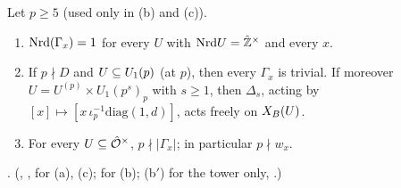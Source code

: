 \begin{lemma}\label{lem:s01-stab}
Let $p\ge5$ (used only in (b) and (c)).
\begin{enumerate}[label=(\alph*)]
\item $\mathrm{Nrd}(\Gamma_x)=1$ for every $U$ with $\mathrm{Nrd} U=\hat{\mathbb{Z}}^\times$ and every $x$.
\item If $p\nmid D$ and $U\subseteq U_1(p)$ (at $p$), then every $\Gamma_x$ is trivial. If moreover $U=U^{(p)}\times U_{1}(p^s)_p$ with $s\ge1$,
  then $\Delta_s$, acting by $[x]\mapsto[x\,\iota_p^{-1}\mathrm{diag}(1,d)]$, acts freely on $X_B(U)$.
\item For every $U\subseteq\hat{\mathcal{O}}^\times$, $p\nmid|\Gamma_x|$; in particular $p\nmid w_x$.
\end{enumerate}
\stproved. \stformal{} (, ,
 for (a), (c);  for (b); (b$'$) for the tower only,
.)
\end{lemma}
